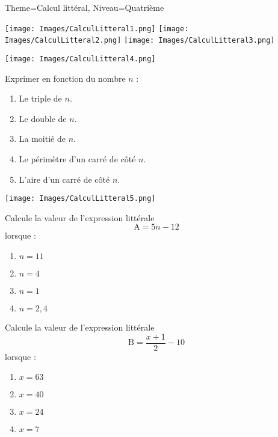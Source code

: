 \documentclass[11pt]{article}
\begin{document}
\begin{multicols}{2}

\begin{Maquette}[Fiche]{Theme=Calcul littéral, Niveau=Quatrième}

\begin{exercice}
    \texttt{[image: Images/CalculLitteral1.png]}
    \texttt{[image: Images/CalculLitteral2.png]}
    \texttt{[image: Images/CalculLitteral3.png]}
\end{exercice}

\begin{exercice}
\begin{center}
\texttt{[image: Images/CalculLitteral4.png]}
\end{center}
\end{exercice}

\begin{exercice}[Titre=En fonction de …]
    Exprimer en fonction du nombre $n$ :
    \begin{enumerate}
        \item Le triple de $n$.
        \item Le double de $n$.
        \item La moitié de $n$.
        \item Le périmètre d’un carré de côté $n$.
        \item L’aire d’un carré de côté $n$.
    \end{enumerate}
\end{exercice}

\begin{exercice}
    \texttt{[image: Images/CalculLitteral5.png]}
\end{exercice}

\begin{exercice}
    Calcule la valeur de l’expression littérale 
    \[
    \textrm{A} = 5 n - 12
    \]
    lorsque :
    \begin{enumerate}
        \item $n=11$
        \item $n=4$
        \item $n=1$
        \item $n=2,4$
    \end{enumerate}
\end{exercice}

\begin{exercice}
    Calcule la valeur de l’expression littérale 
    \[
    \textrm{B} = \dfrac{x+1}{2} - 10
    \]
    lorsque :
    \begin{enumerate}
        \item $x=63$
        \item $x=40$
        \item $x=24$
        \item $x=7$
    \end{enumerate}


\end{exercice}
\end{Maquette}
\end{multicols}
\end{document}
